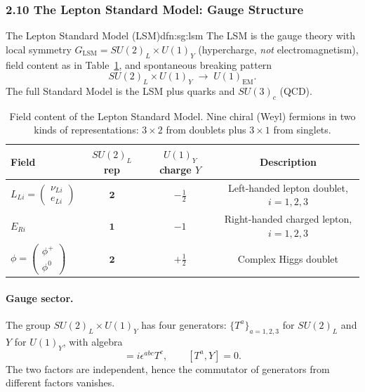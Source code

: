 \documentclass[12pt,a4paper]{article}
\newcommand{\dfn}[3][]{\begin{Definition}{#2}{#1}#3\end{Definition}}
\begin{document}
\subsubsection*{2.10 \quad The Lepton Standard Model: Gauge Structure}

\dfn[dfn:sg:lsm]{The Lepton Standard Model (LSM)}{
  The LSM is the gauge theory with local symmetry $G_{\mathrm{LSM}} = SU(2)_L \times U(1)_Y$ (hypercharge, \emph{not} electromagnetism), field content as in Table~\ref{tab:sg:lsm}, and spontaneous breaking pattern
  \begin{equation}
    SU(2)_L \times U(1)_Y \;\longrightarrow\; U(1)_{\mathrm{EM}} .
    \label{eq:sg:lsm_breaking}
  \end{equation}
  The full Standard Model is the LSM plus quarks and $SU(3)_c$ (QCD).
}

\begin{table}[ht]
\centering
\renewcommand{\arraystretch}{1.3}
\begin{tabular}{lccc}
\toprule
Field & $SU(2)_L$ rep & $U(1)_Y$ charge $Y$ & Description \\
\midrule
$L_{Li} = \begin{pmatrix}\nu_{Li} \\ e_{Li}\end{pmatrix}$ & $\mathbf{2}$ & $-\tfrac{1}{2}$ & Left-handed lepton doublet, $i=1,2,3$ \\[8pt]
$E_{Ri}$ & $\mathbf{1}$ & $-1$ & Right-handed charged lepton, $i=1,2,3$ \\[4pt]
$\phi = \begin{pmatrix}\phi^+ \\ \phi^0\end{pmatrix}$ & $\mathbf{2}$ & $+\tfrac{1}{2}$ & Complex Higgs doublet \\
\bottomrule
\end{tabular}
\caption{Field content of the Lepton Standard Model. Nine chiral (Weyl) fermions in two kinds of representations: $3 \times 2$ from doublets plus $3\times 1$ from singlets.}
\label{tab:sg:lsm}
\end{table}

\paragraph{Gauge sector.}
The group $SU(2)_L \times U(1)_Y$ has four generators: $\{T^a\}_{a=1,2,3}$ for $SU(2)_L$ and $Y$ for $U(1)_Y$, with algebra
\begin{equation}
  [T^a, T^b] = i\epsilon^{abc}T^c ,
  \qquad
  [T^a, Y] = 0 .
  \label{eq:sg:algebra}
\end{equation}
The two factors are independent, hence the commutator of generators from different factors vanishes.
\end{document}
